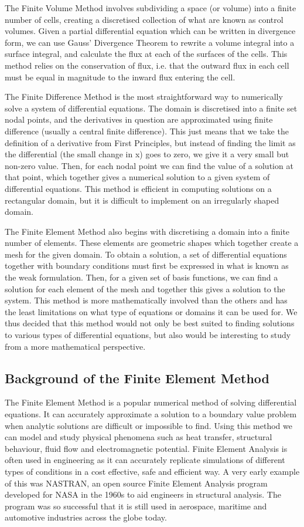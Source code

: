 \documentclass{article}
\begin{document}
The Finite Volume Method involves subdividing a space (or volume) into a finite number of cells, creating a discretised collection of what are known as control volumes. Given a partial differential equation which can be written in divergence form, we can use Gauss' Divergence Theorem to rewrite a volume integral into a surface integral, and calculate the flux at each of the surfaces of the cells. This method relies on the conservation of flux, i.e. that the outward flux in each cell must be equal in magnitude to the inward flux entering the cell.

The Finite Difference Method is the most straightforward way to numerically solve a system of differential equations. The domain is discretised into a finite set nodal points, and the derivatives in question are approximated using finite difference (usually a central finite difference). This just means that we take the definition of a derivative from First Principles, but instead of finding the limit as the differential (the small change in x) goes to zero, we give it a very small but non-zero value. Then, for each nodal point we can find the value of a solution at that point, which together gives a numerical solution to a given system of differential equations. This method is efficient in computing solutions on a rectangular domain, but it is difficult to implement on an irregularly shaped domain.

The Finite Element Method also begins with discretising a domain into a finite number of elements. These elements are geometric shapes which together create a mesh for the given domain. To obtain a solution, a set of differential equations together with boundary conditions must first be expressed in what is known as the weak formulation. Then, for a given set of basis functions, we can find a solution for each element of the mesh and together this gives a solution to the system. This method is more mathematically involved than the others and has the least limitations on what type of equations or domains it can be used for. We thus decided that this method would not only be best suited to finding solutions to various types of differential equations, but also would be interesting to study from a more mathematical perspective. 
\subsection{Background of the Finite Element Method} 
The Finite Element Method is a popular numerical method of solving differential equations. It can accurately approximate a solution to a boundary value problem when analytic solutions are difficult or impossible to find. Using this method we can model and study physical phenomena such as heat transfer, structural behaviour, fluid flow and electromagnetic potential. Finite Element Analysis is often used in engineering as it can accurately replicate simulations of different types of conditions in a cost effective, safe and efficient way. A very early example of this was NASTRAN, an open source Finite Element Analysis program developed for NASA in the 1960s to aid engineers in structural analysis. The program was so successful that it is still used in aerospace, maritime and automotive industries across the globe today. 
\end{document}
